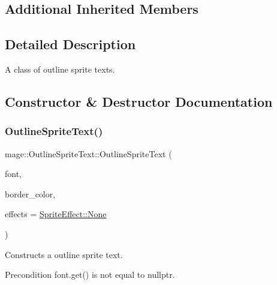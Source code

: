 \subsection*{Additional Inherited Members}


\subsection{Detailed Description}
A class of outline sprite texts. 

\subsection{Constructor \& Destructor Documentation}
\hypertarget{classmage_1_1_outline_sprite_text_a005afe0bf463128c91d609afe4e63641}{}\label{classmage_1_1_outline_sprite_text_a005afe0bf463128c91d609afe4e63641} 
\subsubsection{\texorpdfstring{Outline\+Sprite\+Text()}{OutlineSpriteText()}\hspace{0.1cm}{\footnotesize\ttfamily [1/4]}}
{\footnotesize\ttfamily mage\+::\+Outline\+Sprite\+Text\+::\+Outline\+Sprite\+Text (\begin{DoxyParamCaption}\item[{\hyperlink{namespacemage_a1e01ae66713838a7a67d30e44c67703e}{Shared\+Ptr}$<$ \hyperlink{classmage_1_1_sprite_font}{Sprite\+Font} $>$}]{font,  }\item[{const \hyperlink{structmage_1_1_color}{Color} \&}]{border\+\_\+color,  }\item[{\hyperlink{namespacemage_a9cfe18123066ba4236f548f9de75d881}{Sprite\+Effect}}]{effects = {\ttfamily \hyperlink{namespacemage_a5e7e18b0154373ce8fc942fe3f6b27fda6adf97f83acf6453d4a6a4b1070f3754}{Sprite\+Effect\+::\+None}} }\end{DoxyParamCaption})\hspace{0.3cm}{\ttfamily [explicit]}}

Constructs a outline sprite text.

\begin{DoxyPrecond}{Precondition}
{\ttfamily font.\+get()} is not equal to {\ttfamily nullptr}. 
\end{DoxyPrecond}


